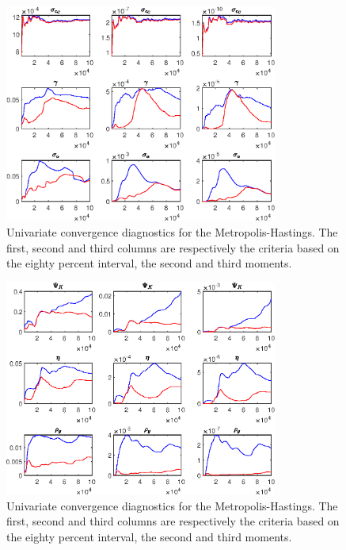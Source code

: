 \begin{figure}[H]
\centering 
\includegraphics[width=0.80\textwidth]{BRS_growth_util/Output/BRS_growth_util_udiag3}
\caption{Univariate convergence diagnostics for the Metropolis-Hastings.
The first, second and third columns are respectively the criteria based on
the eighty percent interval, the second and third moments.}\label{Fig:UnivariateDiagnostics:3}
\end{figure}

\begin{figure}[H]
\centering 
\includegraphics[width=0.80\textwidth]{BRS_growth_util/Output/BRS_growth_util_udiag4}
\caption{Univariate convergence diagnostics for the Metropolis-Hastings.
The first, second and third columns are respectively the criteria based on
the eighty percent interval, the second and third moments.}\label{Fig:UnivariateDiagnostics:4}
\end{figure}

